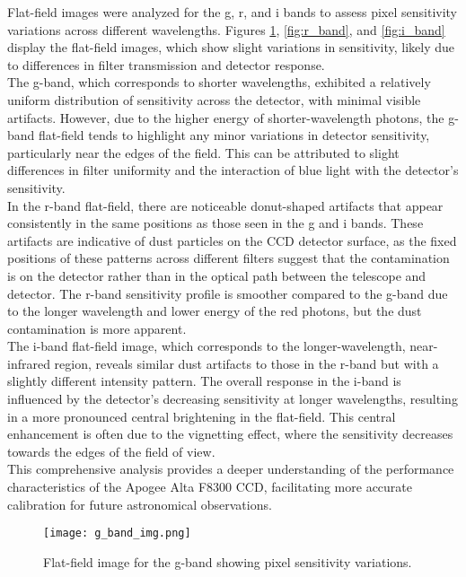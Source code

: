 \documentclass[linenumbers,twocolumn]{aastex631}
\begin{document}
Flat-field images were analyzed for the g, r, and i bands to assess pixel sensitivity variations across different wavelengths. Figures \ref{fig:g_band}, \ref{fig:r_band}, and \ref{fig:i_band} display the flat-field images, which show slight variations in sensitivity, likely due to differences in filter transmission and detector response. \\

The g-band, which corresponds to shorter wavelengths, exhibited a relatively uniform distribution of sensitivity across the detector, with minimal visible artifacts. However, due to the higher energy of shorter-wavelength photons, the g-band flat-field tends to highlight any minor variations in detector sensitivity, particularly near the edges of the field. This can be attributed to slight differences in filter uniformity and the interaction of blue light with the detector's sensitivity. \\

In the r-band flat-field, there are noticeable donut-shaped artifacts that appear consistently in the same positions as those seen in the g and i bands. These artifacts are indicative of dust particles on the CCD detector surface, as the fixed positions of these patterns across different filters suggest that the contamination is on the detector rather than in the optical path between the telescope and detector. The r-band sensitivity profile is smoother compared to the g-band due to the longer wavelength and lower energy of the red photons, but the dust contamination is more apparent. \\

The i-band flat-field image, which corresponds to the longer-wavelength, near-infrared region, reveals similar dust artifacts to those in the r-band but with a slightly different intensity pattern. The overall response in the i-band is influenced by the detector's decreasing sensitivity at longer wavelengths, resulting in a more pronounced central brightening in the flat-field. This central enhancement is often due to the vignetting effect, where the sensitivity decreases towards the edges of the field of view. \\

This comprehensive analysis provides a deeper understanding of the performance characteristics of the Apogee Alta F8300 CCD, facilitating more accurate calibration for future astronomical observations.

\begin{figure}[h]
    \centering
    \texttt{[image: g\_band\_img.png]}
    \caption{Flat-field image for the g-band showing pixel sensitivity variations.}
    \label{fig:g_band}
\end{figure}
\end{document}
